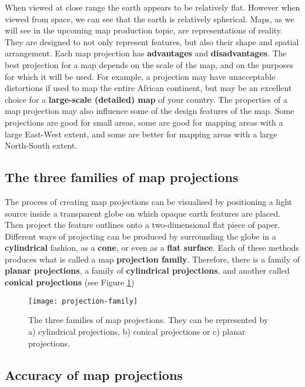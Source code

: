 When viewed at close range the earth appears to be relatively flat. However
when viewed from space, we can see that the earth is relatively spherical.
Maps, as we will see in the upcoming map production topic, are
representations of reality. They are designed to not only represent features,
but also their shape and spatial arrangement. Each map projection has
\textbf{advantages} and \textbf{disadvantages}. The best projection for a map
depends on the
scale of the map, and on the purposes for which it will be used. For example,
a projection may have unacceptable distortions if used to map the entire
African continent, but may be an excellent choice for a \textbf{large-scale
(detailed) map} of your country. The properties of a map projection may also
influence some of the design features of the map. Some projections are good
for small areas, some are good for mapping areas with a large East-West
extent, and some are better for mapping areas with a large North-South
extent. 

\subsection{The three families of map projections}

The process of creating map projections can be visualised by positioning a
light source inside a transparent globe on which opaque earth features are
placed. Then project the feature outlines onto a two-dimensional flat piece
of paper. Different ways of projecting can be produced by surrounding the
globe in a \textbf{cylindrical} fashion, as a \textbf{cone}, or even as a
\textbf{flat surface}. Each of
these methods produces what is called a map \textbf{projection family}.
Therefore, there is a family of \textbf{planar projections}, a family of
\textbf{cylindrical projections}, and another called \textbf{conical
projections} (see Figure \ref{fig:projfamilies})  

\begin{figure}[ht]
   \begin{center}
   \caption{The three families of map projections. They can be represented by
a) cylindrical projections, b) conical projections or c) planar projections.}
\label{fig:projfamilies}\smallskip
   \texttt{[image: projection-family]}
\end{center}
\end{figure}

\subsection{Accuracy of map projections}

